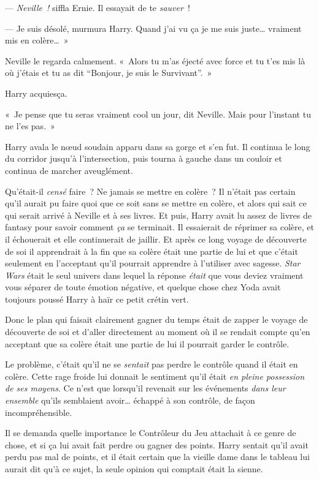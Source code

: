 --- \emph{Neville~!} siffla Ernie. Il essayait de te \emph{sauver}~!

--- Je suis désolé, murmura Harry. Quand j'ai vu ça je me suis juste… vraiment mis en colère…~»

Neville le regarda calmement. «~Alors tu m'as éjecté avec force et tu t'es mis là où j'étais et tu as dit “Bonjour, je suis le Survivant”.~»

Harry acquiesça.

«~Je pense que tu seras vraiment cool un jour, dit Neville. Mais pour l'instant tu ne l'es pas.~»

Harry avala le nœud soudain apparu dans sa gorge et s'en fut. Il continua le long du corridor jusqu'à l'intersection, puis tourna à gauche dans un couloir et continua de marcher aveuglément.

Qu'était-il \emph{censé} faire~? Ne jamais se mettre en colère~? Il n'était pas certain qu'il aurait pu faire quoi que ce soit sans se mettre en colère, et alors qui sait ce qui serait arrivé à Neville et à ses livres. Et puis, Harry avait lu assez de livres de fantasy pour savoir comment \emph{ça} se terminait. Il essaierait de réprimer sa colère, et il échouerait et elle continuerait de jaillir. Et après ce long voyage de découverte de soi il apprendrait à la fin que sa colère était une partie de lui et que c'était seulement en l'acceptant qu'il pourrait apprendre à l'utiliser avec sagesse. \emph{Star Wars} était le seul univers dans lequel la réponse \emph{était} que vous deviez vraiment vous séparer de toute émotion négative, et quelque chose chez Yoda avait toujours poussé Harry à haïr ce petit crétin vert.

Donc le plan qui faisait clairement gagner du temps était de zapper le voyage de découverte de soi et d'aller directement au moment où il se rendait compte qu'en acceptant que sa colère était une partie de lui il pourrait garder le contrôle.

Le problème, c'était qu'il ne se \emph{sentait} pas perdre le contrôle quand il était en colère. Cette rage froide lui donnait le sentiment qu'il était \emph{en pleine possession de ses moyens}. Ce n'est que lorsqu'il revenait sur les événements \emph{dans leur ensemble} qu'ils semblaient avoir… échappé à son contrôle, de façon incompréhensible.

Il se demanda quelle importance le Contrôleur du Jeu attachait à ce genre de chose, et si ça lui avait fait perdre ou gagner des points. Harry sentait qu'il avait perdu pas mal de points, et il était certain que la vieille dame dans le tableau lui aurait dit qu'à ce sujet, la seule opinion qui comptait était la sienne.

